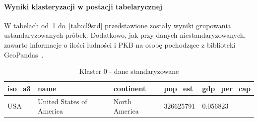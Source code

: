 \documentclass[11pt]{report}
\begin{document}
    \paragraph{Wyniki klasteryzacji w postacji tabelarycznej}
    W tabelach od~\ref{tab:cl0std} do~\ref{tab:cl9std} przedstawione zostały wyniki grupowania ustandaryzowanych próbek.
    Dodatkowo, jak przy danych niestandaryzowanych, zawarto informacje o ilości ludności i PKB na osobę pochodzące z biblioteki GeoPandas~\cite{geopandas}.

    \begin{table}[h!]
        \caption {Klaster 0 - dane standaryzowane} \label{tab:cl0std}
        \begin{tabular}{lllll}
            \hline
            \multicolumn{1}{|l|}{iso\_a3} & \multicolumn{1}{l|}{name} & \multicolumn{1}{l|}{continent} & \multicolumn{1}{l|}{pop\_est} & \multicolumn{1}{l|}{gdp\_per\_cap} \\ \hline
            USA                           & United States of America  & North America                  & 326625791                     & 0.056823
        \end{tabular}
    \end{table}
\end{document}
